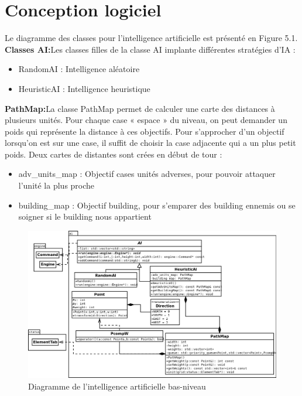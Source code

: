 \documentclass[12pt]{report}
\begin{document}
\section{Conception logiciel}
\paragraphe{}Le diagramme des classes pour l’intelligence artificielle est présenté en Figure 5.1.
\paragraphe{}\textbf{Classes AI:}Les classes filles de la classe AI implante différentes stratégies d’IA :
\begin{itemize}
    \item RandomAI : Intelligence aléatoire
    \item HeuristicAI : Intelligence heuristique
\end{itemize}
\paragraphe{}\textbf{PathMap:}La classe PathMap permet de calculer une carte des distances à plusieurs unités. Pour chaque case « espace » du niveau, on peut demander un poids qui représente la distance à ces objectifs. Pour s’approcher d’un objectif lorsqu’on est sur une case, il suffit de choisir la case
adjacente qui a un plus petit poids. Deux cartes de distantes
sont crées en début de tour :
\begin{itemize}
    \item adv\_units\_map : Objectif cases unités adverses, pour pouvoir attaquer l'unité la plus proche
    \item building\_map : Objectif building, pour s’emparer des building ennemis ou se soigner si le building nous appartient
\end{itemize}
    \newpage
\thispagestyle{empty}
\begin{landscape}
\begin{figure}[h]
    \begin{center}
    \includegraphics[scale=0.6]{ai.png}
    \end{center}
    \caption{Diagramme de l'intelligence artificielle bas-niveau}
\end{figure}
\end{landscape}
\end{document}
